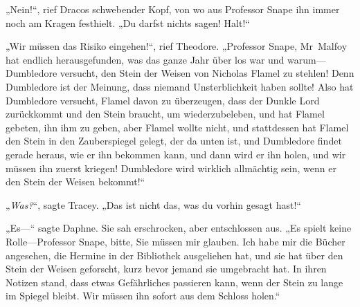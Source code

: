 „Nein!“, rief Dracos schwebender Kopf, von wo aus Professor Snape ihn immer noch am Kragen festhielt. „Du darfst nichts sagen! Halt!“

„Wir müssen das Risiko eingehen!“, rief Theodore. „Professor Snape, Mr~Malfoy hat endlich herausgefunden, was das ganze Jahr über los war und warum—Dumbledore versucht, den Stein der Weisen von Nicholas Flamel zu stehlen! Denn Dumbledore ist der Meinung, dass niemand Unsterblichkeit haben sollte! Also hat Dumbledore versucht, Flamel davon zu überzeugen, dass der Dunkle Lord zurückkommt und den Stein braucht, um wiederzubeleben, und hat Flamel gebeten, ihn ihm zu geben, aber Flamel wollte nicht, und stattdessen hat Flamel den Stein in den Zauberspiegel gelegt, der da unten ist, und Dumbledore findet gerade heraus, wie er ihn bekommen kann, und dann wird er ihn holen, und wir müssen ihn zuerst kriegen! Dumbledore wird wirklich allmächtig sein, wenn er den Stein der Weisen bekommt!“

„\emph{Was?}“, sagte Tracey. „Das ist nicht das, was du vorhin gesagt hast!“

„Es—“ sagte Daphne. Sie sah erschrocken, aber entschlossen aus. „Es spielt keine Rolle—Professor Snape, bitte, Sie müssen mir glauben. Ich habe mir die Bücher angesehen, die Hermine in der Bibliothek ausgeliehen hat, und sie hat über den Stein der Weisen geforscht, kurz bevor jemand sie umgebracht hat. In ihren Notizen stand, dass etwas Gefährliches passieren kann, wenn der Stein zu lange im Spiegel bleibt. Wir müssen ihn sofort aus dem Schloss holen.“

